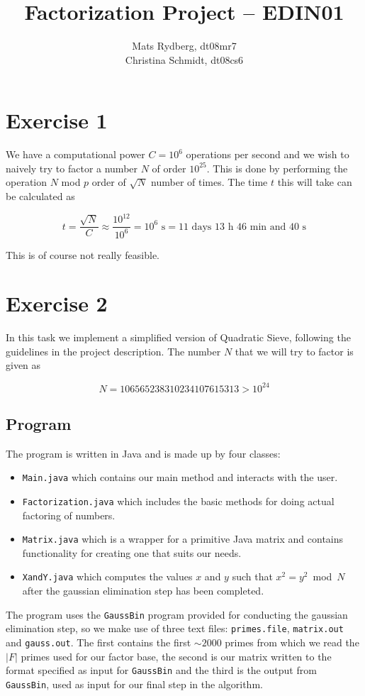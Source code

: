\documentclass[a4paper,titlepage]{article}
\title{Factorization Project -- EDIN01}
\author{    Mats Rydberg, dt08mr7       \\
            Christina Schmidt, dt08cs6
  }
\begin{document}
\maketitle
\section*{Exercise 1}
We have a computational power $C = 10^6$ operations per second and we wish to naively try to factor a number $N$ of order $10^{25}$. This is done by performing the operation $N$ mod $p$ order of $\sqrt{N}$ number of times. The time $t$ this will take can be calculated as

$$
t = \frac{\sqrt{N}}{C} \approx \frac{10^{12}}{10^6} = 10^6 \text{ s} = 11 \text{ days } 13 \text{ h } 46 \text{ min and  } 40 \text{ s}
$$

This is of course not really feasible.

\section*{Exercise 2}
In this task we implement a simplified version of Quadratic Sieve, following the guidelines in the project description. The number $N$ that we will try to factor is given as

$$
N = 106 565 238 310 234 107 615 313 > 10^{24}
$$

\subsection*{Program}
The program is written in Java and is made up by four classes:
\begin{itemize}
\item \texttt{Main.java} which contains our main method and interacts with the user.
\item \texttt{Factorization.java} which includes the basic methods for doing actual factoring of numbers.
\item \texttt{Matrix.java} which is a wrapper for a primitive Java matrix and contains functionality for creating one that suits our needs.
\item \texttt{XandY.java} which computes the values $x$ and $y$ such that $x^2 = y^2$~mod~$N$ after the gaussian elimination step has been completed.
\end{itemize}

The program uses the \texttt{GaussBin} program provided for conducting the gaussian elimination step, so we make use of three text files: \texttt{primes.file},  \texttt{matrix.out} and \texttt{gauss.out}. The first contains the first $\sim 2000$ primes from which we read the $|F|$ primes used for our factor base, the second is our matrix written to the format specified as input for \texttt{GaussBin} and the third is the output from \texttt{GaussBin}, used as input for our final step in the algorithm.
\end{document}
